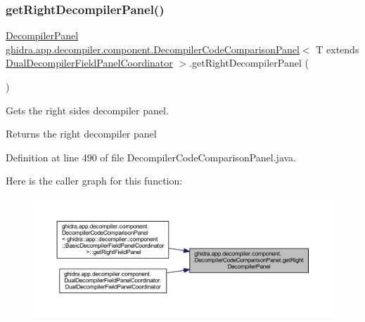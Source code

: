 \subsubsection{\texorpdfstring{getRightDecompilerPanel()}{getRightDecompilerPanel()}}
{\footnotesize\ttfamily \mbox{\hyperlink{classghidra_1_1app_1_1decompiler_1_1component_1_1_decompiler_panel}{Decompiler\+Panel}} \mbox{\hyperlink{classghidra_1_1app_1_1decompiler_1_1component_1_1_decompiler_code_comparison_panel}{ghidra.\+app.\+decompiler.\+component.\+Decompiler\+Code\+Comparison\+Panel}}$<$ T extends \mbox{\hyperlink{classghidra_1_1app_1_1decompiler_1_1component_1_1_dual_decompiler_field_panel_coordinator}{Dual\+Decompiler\+Field\+Panel\+Coordinator}} $>$.get\+Right\+Decompiler\+Panel (\begin{DoxyParamCaption}{ }\end{DoxyParamCaption})\hspace{0.3cm}{\ttfamily [inline]}}

Gets the right side\textquotesingle{}s decompiler panel. \begin{DoxyReturn}{Returns}
the right decompiler panel 
\end{DoxyReturn}


Definition at line 490 of file Decompiler\+Code\+Comparison\+Panel.\+java.

Here is the caller graph for this function\+:
\nopagebreak
\begin{figure}[H]
\begin{center}
\leavevmode
\includegraphics[width=350pt]{classghidra_1_1app_1_1decompiler_1_1component_1_1_decompiler_code_comparison_panel_afd2848ffb64b02ea479f331871fca416_icgraph}
\end{center}
\end{figure}
\mbox{\label{classghidra_1_1app_1_1decompiler_1_1component_1_1_decompiler_code_comparison_panel_ad9b4c26a0b9ac5d33359777f3bc8bd51}} 
